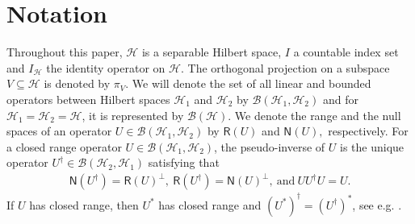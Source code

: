 \documentclass{birkjour}
\theoremstyle{definition}
\theoremstyle{remark}
\numberwithin{equation}{section}
\newcommand{\range}[1]{\mathsf{R}\left( #1 \right)}
\newcommand{\kernel}[1]{\mathsf{N}\left( #1 \right)}
\newcommand{\BL}[1]{
{\mathcal B} \left( #1 \right)
}
\begin{document}
\section{Notation} \label{sec:notation} Throughout this paper, $\mathcal{H}$ is a separable Hilbert space,
$I$ a countable index set and $I_{\mathcal{H}}$ the identity
operator on $\mathcal{H}$. The orthogonal projection on a subspace
$V\subseteq\mathcal{H}$ is denoted by $\pi_V$. We will denote the
set of all linear and bounded operators between Hilbert spaces
$\mathcal{H}_{1}$ and $\mathcal{H}_{2}$ by
$\BL{\mathcal{H}_{1},\mathcal{H}_{2}}$ and for
$\mathcal{H}_{1}=\mathcal{H}_{2}=\mathcal{H}$, it is represented
by $\BL{\mathcal{H}}$.
 We denote the range and the null spaces
of an operator $U \in \BL{\mathcal{H}_{1},\mathcal{H}_{2}}$ by $\range{U}$ and $\kernel{U},$ respectively.  
For a closed range operator $U \in \BL{\mathcal{H}_{1},\mathcal{H}_{2}}$, the pseudo-inverse of $U$ is the unique
operator $U^{\dag} \in \BL{\mathcal{H}_{2},\mathcal{H}_{1}}$ satisfying that
\begin{eqnarray*}
\kernel{U^{\dag}}=\range{U}^{\perp},\
\range{U^{\dag}}=\kernel{U}^{\perp},\
\text{and}\
UU^{\dag}U=U.
\end{eqnarray*}
If $U$ has closed range, then $U^*$ has
closed range and
$\left(U^*\right)^{\dag}=\left(U^{\dag}\right)^{*}$, see e.g.
\cite[Lemma 2.5.2]{Chr08}.
\end{document}
